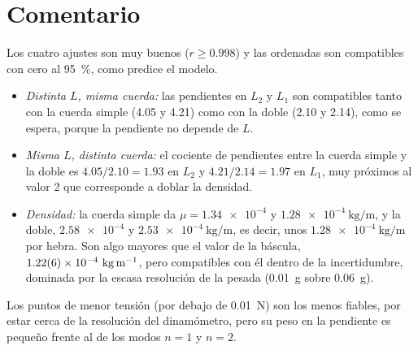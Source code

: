 \documentclass[a4paper,11pt]{article}
\begin{document}
\section*{Comentario}
Los cuatro ajustes son muy buenos ($r\geq\num{0,998}$) y las ordenadas son
compatibles con cero al \SI{95}{\percent}, como predice el modelo.
\begin{itemize}
  \item \emph{Distinta $L$, misma cuerda:} las pendientes en $L_2$ y $L_1$ son
    compatibles tanto con la cuerda simple (\num{4,05} y \num{4,21}) como con la
    doble (\num{2,10} y \num{2,14}), como se espera, porque la pendiente no
    depende de $L$.
  \item \emph{Misma $L$, distinta cuerda:} el cociente de pendientes entre la
    cuerda simple y la doble es $\num{4,05}/\num{2,10}=\num{1,93}$ en $L_2$ y
    $\num{4,21}/\num{2,14}=\num{1,97}$ en $L_1$, muy próximos al valor 2 que
    corresponde a doblar la densidad.
  \item \emph{Densidad:} la cuerda simple da
    $\mu=\num{1,34 e-4}$ y $\num{1,28 e-4}\ \si{\kilogram\per\meter}$, y la doble,
    $\num{2,58 e-4}$ y $\num{2,53 e-4}\ \si{\kilogram\per\meter}$, es decir,
    unos $\num{1,28 e-4}\ \si{\kilogram\per\meter}$ por hebra. Son algo mayores que
    el valor de la báscula, $\num{1,22 \pm 0,06 e-4}\ \si{\kilogram\per\meter}$,
    pero compatibles con él dentro de la incertidumbre, dominada por la escasa
    resolución de la pesada (\SI{0,01}{\gram} sobre \SI{0,06}{\gram}).
\end{itemize}
Los puntos de menor tensión (por debajo de \SI{0,01}{\newton}) son los menos
fiables, por estar cerca de la resolución del dinamómetro, pero su peso en la
pendiente es pequeño frente al de los modos $n=1$ y $n=2$.
\end{document}
